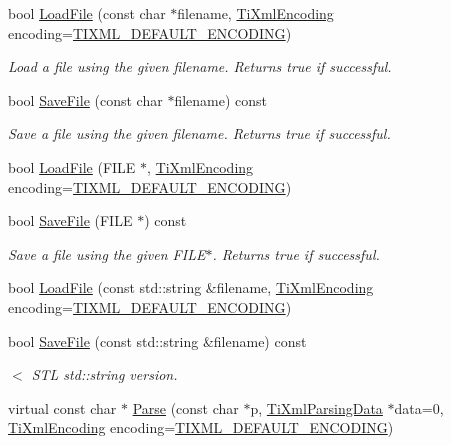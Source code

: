 \begin{DoxyCompactItemize}
bool \hyperlink{class_ti_xml_document_a879cdf5e981b8b2d2ef82f2546dd28fb}{Load\-File} (const char $\ast$filename, \hyperlink{tinyxml_8h_a88d51847a13ee0f4b4d320d03d2c4d96}{Ti\-Xml\-Encoding} encoding=\hyperlink{tinyxml_8h_ad5b8b092878e9010d6400cb6c13d4879}{T\-I\-X\-M\-L\-\_\-\-D\-E\-F\-A\-U\-L\-T\-\_\-\-E\-N\-C\-O\-D\-I\-N\-G})
\begin{DoxyCompactList}\small\item\em Load a file using the given filename. Returns true if successful. \end{DoxyCompactList}\item 
bool \hyperlink{class_ti_xml_document_ae869f5ebf7fc54c4a1d737fb4689fd44}{Save\-File} (const char $\ast$filename) const 
\begin{DoxyCompactList}\small\item\em Save a file using the given filename. Returns true if successful. \end{DoxyCompactList}\item 
bool \hyperlink{class_ti_xml_document_a41f6fe7200864d1dca663d230caf8db6}{Load\-File} (F\-I\-L\-E $\ast$, \hyperlink{tinyxml_8h_a88d51847a13ee0f4b4d320d03d2c4d96}{Ti\-Xml\-Encoding} encoding=\hyperlink{tinyxml_8h_ad5b8b092878e9010d6400cb6c13d4879}{T\-I\-X\-M\-L\-\_\-\-D\-E\-F\-A\-U\-L\-T\-\_\-\-E\-N\-C\-O\-D\-I\-N\-G})
\item 
bool \hyperlink{class_ti_xml_document_acf1672b4538c6d1d441f9f108aea2bf4}{Save\-File} (F\-I\-L\-E $\ast$) const 
\begin{DoxyCompactList}\small\item\em Save a file using the given F\-I\-L\-E$\ast$. Returns true if successful. \end{DoxyCompactList}\item 
bool \hyperlink{class_ti_xml_document_a18ae6ed34fed7991ebc220862dfac884}{Load\-File} (const std\-::string \&filename, \hyperlink{tinyxml_8h_a88d51847a13ee0f4b4d320d03d2c4d96}{Ti\-Xml\-Encoding} encoding=\hyperlink{tinyxml_8h_ad5b8b092878e9010d6400cb6c13d4879}{T\-I\-X\-M\-L\-\_\-\-D\-E\-F\-A\-U\-L\-T\-\_\-\-E\-N\-C\-O\-D\-I\-N\-G})
\item 
bool \hyperlink{class_ti_xml_document_a3d4fae0463f3f03679ba0b7cf6f2df52}{Save\-File} (const std\-::string \&filename) const 
\begin{DoxyCompactList}\small\item\em $<$ S\-T\-L std\-::string version. \end{DoxyCompactList}\item 
virtual const char $\ast$ \hyperlink{class_ti_xml_document_a789ad2f06f93d52bdb5570b2f3670289}{Parse} (const char $\ast$p, \hyperlink{class_ti_xml_parsing_data}{Ti\-Xml\-Parsing\-Data} $\ast$data=0, \hyperlink{tinyxml_8h_a88d51847a13ee0f4b4d320d03d2c4d96}{Ti\-Xml\-Encoding} encoding=\hyperlink{tinyxml_8h_ad5b8b092878e9010d6400cb6c13d4879}{T\-I\-X\-M\-L\-\_\-\-D\-E\-F\-A\-U\-L\-T\-\_\-\-E\-N\-C\-O\-D\-I\-N\-G})

\end{DoxyCompactItemize}
